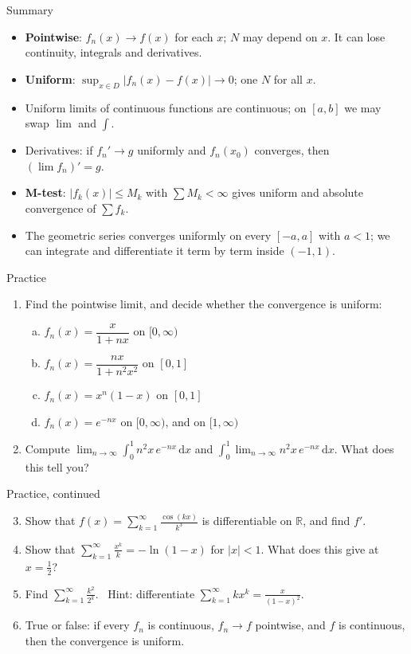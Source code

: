 \documentclass{wosm-slides}
\newcommand{\R}{\mathbb{R}}
\newcommand{\dx}{\,\mathrm{d}x}
\begin{document}
\begin{frame}{Summary}
  \begin{itemize}
    \item \textbf{Pointwise}: $f_n(x) \to f(x)$ for each $x$; $N$ may depend on $x$.
      It can lose continuity, integrals and derivatives.
    \item \textbf{Uniform}: $\sup_{x \in D} |f_n(x) - f(x)| \to 0$; one $N$ for all $x$.
    \item Uniform limits of continuous functions are continuous; on $[a, b]$ we may swap
      $\lim$ and $\int$.
    \item Derivatives: if $f_n' \to g$ uniformly and $f_n(x_0)$ converges, then
      $(\lim f_n)' = g$.
    \item \textbf{M-test}: $|f_k(x)| \le M_k$ with $\sum M_k < \infty$ gives uniform and
      absolute convergence of $\sum f_k$.
    \item The geometric series converges uniformly on every $[-a, a]$ with $a < 1$; we can
      integrate and differentiate it term by term inside $(-1, 1)$.
  \end{itemize}
\end{frame}

\begin{frame}{Practice}
  \small
  \begin{enumerate}
    \item Find the pointwise limit, and decide whether the convergence is uniform:
      \begin{enumerate}[(a)]
        \item $f_n(x) = \dfrac{x}{1 + nx}$ on $[0, \infty)$
        \item $f_n(x) = \dfrac{nx}{1 + n^2x^2}$ on $[0, 1]$
        \item $f_n(x) = x^n (1 - x)$ on $[0, 1]$
        \item $f_n(x) = e^{-nx}$ on $[0, \infty)$, and on $[1, \infty)$
      \end{enumerate}
    \item Compute $\lim_{n\to\infty} \int_0^1 n^2 x\, e^{-nx} \dx$ and
      $\int_0^1 \lim_{n\to\infty} n^2 x\, e^{-nx} \dx$. What does this tell you?
  \end{enumerate}
\end{frame}

\begin{frame}{Practice, continued}
  \small
  \begin{enumerate}
    \setcounter{enumi}{2}
    \item Show that $f(x) = \sum_{k=1}^\infty \frac{\cos(kx)}{k^3}$ is differentiable on $\R$,
      and find $f'$.
    \item Show that $\sum_{k=1}^\infty \frac{x^k}{k} = -\ln(1 - x)$ for $|x| < 1$.
      What does this give at $x = \frac12$?
    \item Find $\sum_{k=1}^\infty \frac{k^2}{2^k}$. \ Hint: differentiate
      $\sum_{k=1}^\infty k x^k = \frac{x}{(1-x)^2}$.
    \item True or false: if every $f_n$ is continuous, $f_n \to f$ pointwise, and $f$ is
      continuous, then the convergence is uniform.
  \end{enumerate}
\end{frame}
\end{document}
